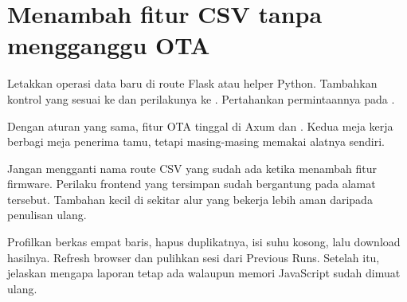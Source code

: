 \section{Menambah fitur CSV tanpa mengganggu OTA}

Letakkan operasi data baru di route Flask atau helper Python. Tambahkan kontrol yang sesuai ke  dan perilakunya ke . Pertahankan permintaannya pada .

Dengan aturan yang sama, fitur OTA tinggal di Axum dan . Kedua meja kerja berbagi meja penerima tamu, tetapi masing-masing memakai alatnya sendiri.

\begin{warningbox}
Jangan mengganti nama route CSV yang sudah ada ketika menambah fitur firmware. Perilaku frontend yang tersimpan sudah bergantung pada alamat tersebut. Tambahan kecil di sekitar alur yang bekerja lebih aman daripada penulisan ulang.
\end{warningbox}

\begin{checkpoint}
Profilkan berkas empat baris, hapus duplikatnya, isi suhu kosong, lalu download hasilnya. Refresh browser dan pulihkan sesi dari Previous Runs. Setelah itu, jelaskan mengapa laporan tetap ada walaupun memori JavaScript sudah dimuat ulang.
\end{checkpoint}
